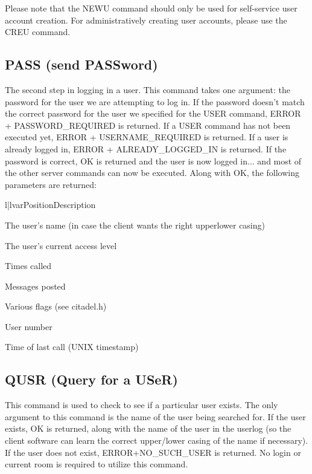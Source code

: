  Please note that the NEWU command should only be used for self-service
user account creation.  For administratively creating user accounts, please
use the CREU command.



\subsection{PASS (send PASSword)}

 The second step in logging in a user.  This command takes one argument: the
password for the user we are attempting to log in.  If the password doesn't
match the correct password for the user we specified for the USER command,
ERROR + PASSWORD_REQUIRED is returned.  If a USER command has not been
executed yet, ERROR + USERNAME_REQUIRED is returned.  If a user is already
logged in, ERROR + ALREADY_LOGGED_IN is returned.  If the password is
correct, OK is returned and the user is now logged in... and most of the
other server commands can now be executed.  Along with OK, the following
parameters are returned:

\begin{tableii}{l|l}{var}{Position}{Description}

    {The user's name (in case the client wants the right upperlower casing)}

    {The user's current access level}

    {Times called}

    {Messages posted}

    {Various flags (see citadel.h)}

    {User number}

    {Time of last call (UNIX timestamp)}

\end{tableii}



\subsection{QUSR (Query for a USeR)}

 This command is used to check to see if a particular user exists.  The only
argument to this command is the name of the user being searched for.  If
the user exists, OK is returned, along with the name of the user in the userlog
(so the client software can learn the correct upper/lower casing of the name
if necessary).  If the user does not exist, ERROR+NO_SUCH_USER is returned.
No login or current room is required to utilize this command.



